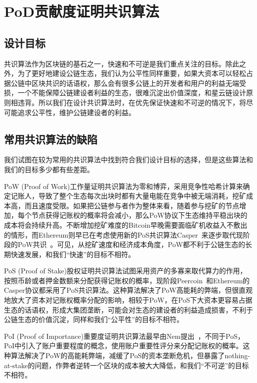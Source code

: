\section{PoD贡献度证明共识算法}
\label{sec:pod}

\subsection{设计目标}
\label{pod:goals}

共识算法作为区块链的基石之一，快速和不可逆是我们重点关注的目标。除此之外，为了更好地建设公链生态，我们认为公平性同样重要，如果大资本可以轻松占据公链中区块共识的话语权，那么会有很多公链上的开发者和用户的利益无端受损，一个不能保障公链建设者利益的生态，很难沉淀出价值深度，和星云链设计原则相违背。所以我们在设计共识算法时，在优先保证快速和不可逆的情况下，将尽可能追求公平性，维护公链建设者的利益。

\subsection{常用共识算法的缺陷}
\label{pod:weakness}

我们试图在较为常用的共识算法中找到符合我们设计目标的选择，但是这些算法和我们的目标多少都有些差距。

PoW (Proof of Work)工作量证明共识算法为零和博弈，采用竞争性哈希计算来确定记账人，导致了整个生态每次出块时都有大量电能在竞争中被无端消耗，挖矿成本高，而且速度受限。如果把公链参与者作为整体来看，随着参与挖矿的节点增加，每个节点获得记账权的概率将会减小，那么PoW协议下生态维持平稳出块的成本将会持续升高。不断增加挖矿难度的Bitcoin早晚需要面临矿机收益入不敷出的情形，而Ethereum则早已在考虑使用新的PoS共识算法Casper~\cite{casper}来逐步取代现阶段的PoW共识~\cite{buterin2013ethereum}。可见，从挖矿速度和经济成本角度，PoW都不利于公链生态的长期快速发展，和我们“快速”的目标不相符。

PoS (Proof of Stake)股权证明共识算法试图采用资产的多寡来取代算力的作用，按照币龄或者押金数额来分配获得记账权的概率，现阶段Peercoin~\cite{king2012peercoin}和Ethereum的Casper协议都采用了PoS共识算法。这种算法解决了PoW高能耗的弊端，但很直观地放大了资本对记账权概率分配的影响，相较于PoW，在PoS下大资本更容易占据生态的话语权，形成大集团垄断，可能会对生态的建设者的利益造成损害，不利于公链生态的价值沉淀，同样和我们“公平性”的目标不相符。

PoI (Proof of Importance)重要度证明共识算法最早由Nem提出~\cite{nem}，不同于PoS，PoI中引入了账户重要程度的概念，使用账户重要性评分来分配记账权的概率。这种算法解决了PoW的高能耗弊端，减缓了PoS的资本垄断危机，但暴露了nothing-at-stake的问题，作弊者逆转一个区块的成本被大大降低，和我们“不可逆”的目标不相符。

